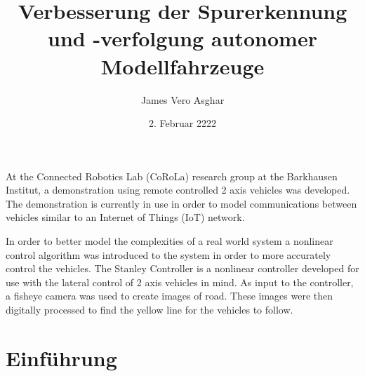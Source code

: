 \documentclass[arbeit=studie,oneside,BCOR=12mm]{ArbeitRST}
\begin{document}

\author{James Vero Asghar}



\title{Verbesserung der Spurerkennung und -verfolgung autonomer Modellfahrzeuge}

\subtitle{}


\date{2. Februar 2222}


\pagestyle{plain}


\maketitle



\selbststaendigkeitserklaerung


{At the Connected Robotics Lab (CoRoLa) research group at the Barkhausen
Institut, a demonstration using remote controlled 2 axis vehicles was
developed. The demonstration is currently in use in order to model
communications between vehicles similar to an Internet of Things (IoT) network.

In order to better model the complexities of a real world system a nonlinear
control algorithm was introduced to the system in order to more accurately
control the vehicles. The Stanley Controller is a nonlinear controller
developed for use with the lateral control of 2 axis vehicles in mind. As input
to the controller, a fisheye camera was used to create images of road. These
images were then digitally processed to find the yellow line for the vehicles
to follow.}


\tableofcontents

\chapter{Einführung}
\end{document}
